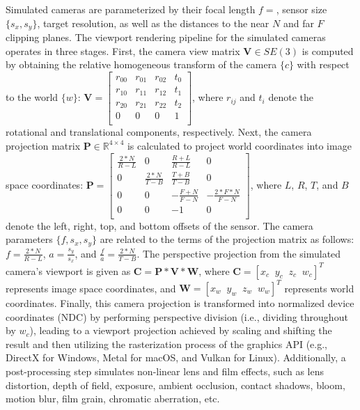 Simulated cameras are parameterized by their focal length $f=$, sensor size $\{s_x, s_y\}$, target resolution, as well as the distances to the near $N$ and far $F$ clipping planes. The viewport rendering pipeline for the simulated cameras operates in three stages. First, the camera view matrix $\mathbf{V} \in SE(3)$ is computed by obtaining the relative homogeneous transform of the camera $\{c\}$ with respect to the world $\{w\}$: $\mathbf{V} = \begin{bmatrix} r_{00} & r_{01} & r_{02} & t_{0} \\ r_{10} & r_{11} & r_{12} & t_{1} \\ r_{20} & r_{21} & r_{22} & t_{2} \\ 0 & 0 & 0 & 1 \\ \end{bmatrix}$, where $r_{ij}$ and $t_i$ denote the rotational and translational components, respectively. Next, the camera projection matrix $\mathbf{P} \in \mathbb{R}^{4 \times 4}$ is calculated to project world coordinates into image space coordinates: $\mathbf{P} = \begin{bmatrix} \frac{2*N}{R-L} & 0 & \frac{R+L}{R-L} & 0 \\ 0 & \frac{2*N}{T-B} & \frac{T+B}{T-B} & 0 \\ 0 & 0 & -\frac{F+N}{F-N} & -\frac{2*F*N}{F-N} \\ 0 & 0 & -1 & 0 \\ \end{bmatrix}$, where $L$, $R$, $T$, and $B$ denote the left, right, top, and bottom offsets of the sensor. The camera parameters $\{f,s_x,s_y\}$ are related to the terms of the projection matrix as follows: $f = \frac{2*N}{R-L}$, $a = \frac{s_y}{s_x}$, and $\frac{f}{a} = \frac{2*N}{T-B}$. The perspective projection from the simulated camera's viewport is given as $\mathbf{C} = \mathbf{P}*\mathbf{V}*\mathbf{W}$, where $\mathbf{C} = \left [x_c\;\;y_c\;\;z_c\;\;w_c \right ]^T$ represents image space coordinates, and $\mathbf{W} = \left [x_w\;\;y_w\;\;z_w\;\;w_w \right ]^T$ represents world coordinates. Finally, this camera projection is transformed into normalized device coordinates (NDC) by performing perspective division (i.e., dividing throughout by $w_c$), leading to a viewport projection achieved by scaling and shifting the result and then utilizing the rasterization process of the graphics API (e.g., DirectX for Windows, Metal for macOS, and Vulkan for Linux). Additionally, a post-processing step simulates non-linear lens and film effects, such as lens distortion, depth of field, exposure, ambient occlusion, contact shadows, bloom, motion blur, film grain, chromatic aberration, etc.

